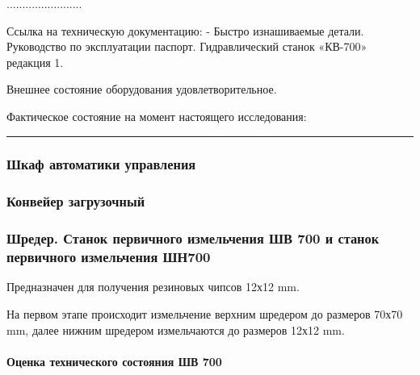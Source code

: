 ........................


Ссылка на техническую документацию:
- Быстро изнашиваемые детали. Руководство по эксплуатации паспорт.
Гидравлический станок «КВ-700» редакция 1.

Внешнее состояние оборудования удовлетворительное.

Фактическое состояние на момент настоящего исследования:

\rule{145mm}{0.1 mm}

\subsubsection{Шкаф автоматики управления}


\vspace{10mm}



\subsubsection{Конвейер загрузочный}

\vspace{10mm}



\subsubsection{Шредер. Станок первичного измельчения ШВ 700 и станок первичного измельчения ШН700}

Предназначен для получения резиновых чипсов 12х12 mm.

На первом этапе происходит измельчение верхним шредером до размеров 70х70 mm, далее нижним шредером измельчаются до размеров 12х12 mm.






\paragraph{Оценка технического состояния ШВ 700}

